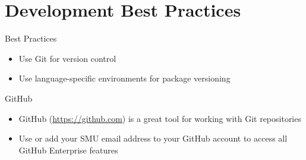 \section{Development Best Practices}

\begin{frame}{Best Practices}
\begin{itemize}
\item Use Git for version control
\item Use language-specific environments for package versioning
\end{itemize}
\end{frame}

\begin{frame}{GitHub}
\begin{itemize}
\item GitHub (\url{https://github.com}) is a great tool for working with Git repositories
\item Use or add your SMU email address to your GitHub account to access all GitHub Enterprise features
\end{itemize}
\end{frame}

